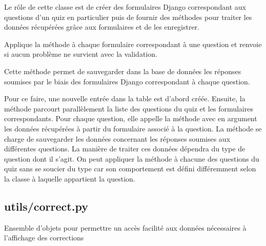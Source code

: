 \documentclass[a4,10pt,french]{sphinxmanual}
\begin{document}
\begin{fulllineitems}
\label{source:quiz.utils.submit.QuizForms}
Le rôle de cette classe est de créer des formulaires Django correspondant aux
questions d'un quiz en particulier puis de fournir des méthodes pour traiter
les données récupérées grâce aux formulaires et de les enregistrer.

\begin{fulllineitems}
\label{source:quiz.utils.submit.QuizForms.are_valid}
Applique la méthode  à chaque formulaire correspondant à une
question et renvoie  si aucun problème ne survient avec la validation.

\end{fulllineitems}


\begin{fulllineitems}
\label{source:quiz.utils.submit.QuizForms.save_answers}
Cette méthode permet de sauvegarder dans la base de données les réponses
soumises par le biais des formulaires Django correspondant à chaque question.

Pour ce faire, une nouvelle entrée dans la table  est
d'abord créée. Ensuite, la méthode parcourt parallèlement la liste des questions
du quiz et les formulaires correspondants. Pour chaque question, elle appelle
la méthode  avec en argument les données récupérées à partir
du formulaire associé à la question. La méthode  se charge
de sauvegarder les données concernant les réponses soumises aux différentes
questions. La manière de traiter ces données dépendra du type de question
dont il s'agit. On peut appliquer la méthode  à chacune
des questions du quiz sans se soucier du type car son comportement est défini
différemment selon la classe à laquelle appartient la question.

\end{fulllineitems}


\end{fulllineitems}



\subsection{utils/correct.py}
\label{source:module-quiz.utils.correct}\label{source:utils-correct-py}
Ensemble d'objets pour permettre un accès facilité aux données nécessaires à
l'affichage des corrections
\end{document}
